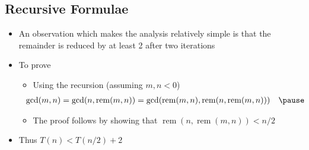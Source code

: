 \newcommand{\rem}{\mathop{\mathrm{rem}}}
\begin{slide}
\section{Recursive Formulae}

\begin{PauseHighLight}
  \begin{itemize}
  \item An observation which makes the analysis relatively simple is
    that the remainder is reduced by at least 2 after two iterations\pause
  \item To prove
    \begin{itemize}
    \item Using the recursion (assuming $m,n<0$)
    \begin{align*}
     \hspace{-1em} \gcd(m,n) &= \gcd(n,\rem(m,n)) = \gcd(\rem(m,n),\rem(n,\rem(m,n)))\hspace{1em}\pause
    \end{align*}
    \item The proof follows by showing that $\rem(n,\rem(m,n))<n/2$\pause
    \end{itemize}
  \item Thus $T(n)<T(n/2)+2$\pause
  \end{itemize}
\end{PauseHighLight}

\end{slide}



